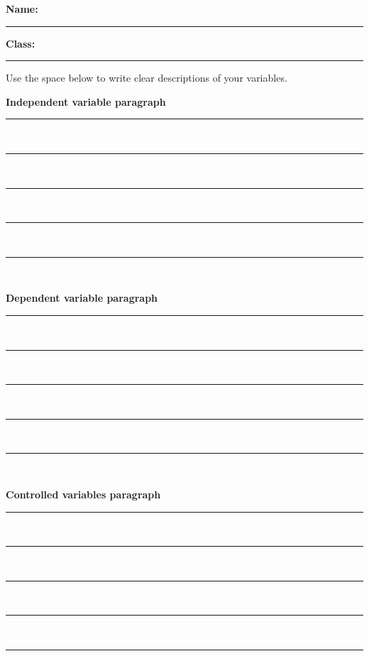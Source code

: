 \documentclass[12pt]{article}
\begin{document}
\vspace{1.5em}

\newpage 
\textbf{Name:} \rule{0.3\textwidth}{0.4pt}
\hfill
\textbf{Class:} \rule{0.25\textwidth}{0.4pt}
\hfill

\vspace{1em}

\begin{tcolorbox}[colback=mygray,colframe=black]
Use the space below to write clear descriptions of your variables.
\end{tcolorbox}


\textbf{Independent variable paragraph}
\vspace{1em}

\rule{\textwidth}{0.4pt}\\[1.2em]
\rule{\textwidth}{0.4pt}\\[1.2em]
\rule{\textwidth}{0.4pt}\\[1.2em]
\rule{\textwidth}{0.4pt}\\[1.2em]
\rule{\textwidth}{0.4pt}\\[1.2em]


\vspace{0.8em}

\textbf{Dependent variable paragraph}

\vspace{1em}

\rule{\textwidth}{0.4pt}\\[1.2em]
\rule{\textwidth}{0.4pt}\\[1.2em]
\rule{\textwidth}{0.4pt}\\[1.2em]
\rule{\textwidth}{0.4pt}\\[1.2em]
\rule{\textwidth}{0.4pt}\\[1.2em]



\vspace{0.8em}

\textbf{Controlled variables paragraph}

\vspace{1em}

\rule{\textwidth}{0.4pt}\\[1.2em]
\rule{\textwidth}{0.4pt}\\[1.2em]
\rule{\textwidth}{0.4pt}\\[1.2em]
\rule{\textwidth}{0.4pt}\\[1.2em]
\rule{\textwidth}{0.4pt}\\[1.2em]



\newpage
\end{document}
